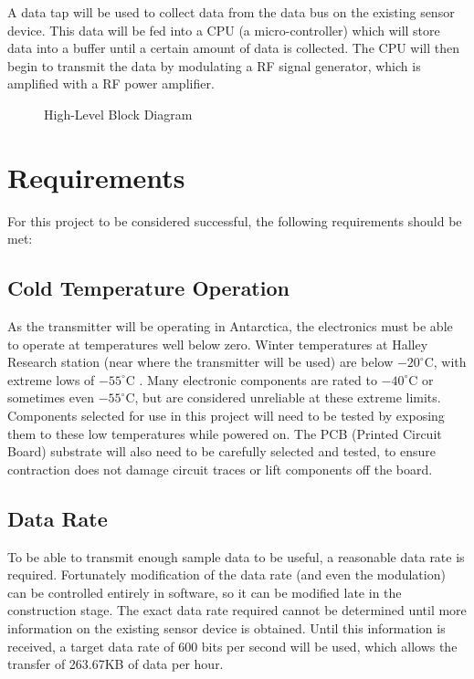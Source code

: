 \documentclass[a4paper,12pt]{article}
\begin{document}
A data tap will be used to collect data from the data bus on the existing sensor device. This data will be fed into a CPU (a micro-controller) which will store data into a buffer until a certain amount of data is collected. The CPU will then begin to transmit the data by modulating a RF signal generator, which is amplified with a RF power amplifier.

\begin{figure}[h!]
\begin{center}
\caption{High-Level Block Diagram}
\label{block_diag}
\end{center}
\end{figure}

\newpage
\section{Requirements}
For this project to be considered successful, the following requirements should be met:

\subsection{Cold Temperature Operation}
As the transmitter will be operating in Antarctica, the electronics must be able to operate at temperatures well below zero. Winter temperatures at Halley Research station (near where the transmitter will be used) are below $-20^\circ$C, with extreme lows of $-55^\circ$C \citep{ref:bas}. Many electronic components are rated to $-40^\circ$C or sometimes even $-55^\circ$C, but are considered unreliable at these extreme limits. Components selected for use in this project will need to be tested by exposing them to these low temperatures while powered on. The PCB (Printed Circuit Board) substrate will also need to be carefully selected and tested, to ensure contraction does not damage circuit traces or lift components off the board. 

\subsection{Data Rate}
To be able to transmit enough sample data to be useful, a reasonable data rate is required. Fortunately modification of the data rate (and even the modulation) can be controlled entirely in software, so it can be modified late in the construction stage. The exact data rate required cannot be determined until more information on the existing sensor device is obtained. Until this information is received, a target data rate of 600 bits per second will be used, which allows the transfer of 263.67KB of data per hour.
\end{document}
